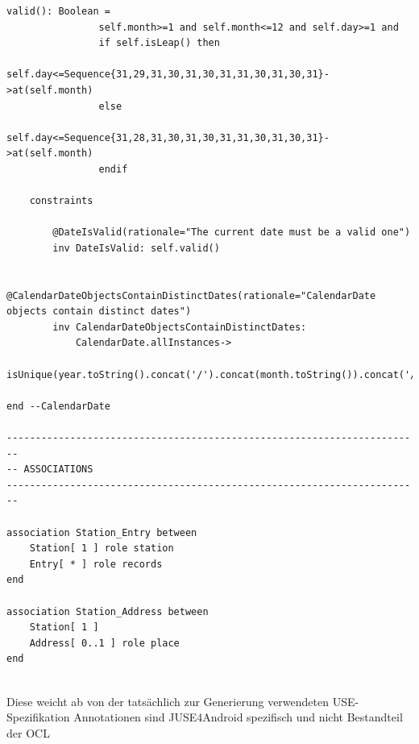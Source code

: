 \documentclass[a4paper,twoside]{article}
\begin{document}
\begin{lstlisting}[caption={Vollständige USE-Spezifikation des IceCream Modells},label=lst:completeUSE]
		valid(): Boolean =
				self.month>=1 and self.month<=12 and self.day>=1 and
				if self.isLeap() then
					self.day<=Sequence{31,29,31,30,31,30,31,31,30,31,30,31}->at(self.month)
				else 
					self.day<=Sequence{31,28,31,30,31,30,31,31,30,31,30,31}->at(self.month)
				endif

	constraints
	
		@DateIsValid(rationale="The current date must be a valid one")
		inv DateIsValid: self.valid()
		
		@CalendarDateObjectsContainDistinctDates(rationale="CalendarDate objects contain distinct dates")
		inv CalendarDateObjectsContainDistinctDates:
			CalendarDate.allInstances->
				isUnique(year.toString().concat('/').concat(month.toString()).concat('/').concat(day.toString()))
		
end --CalendarDate

------------------------------------------------------------------------
-- ASSOCIATIONS
------------------------------------------------------------------------
	
association Station_Entry between
	Station[ 1 ] role station
	Entry[ * ] role records
end

association Station_Address between
	Station[ 1 ] 
	Address[ 0..1 ] role place
end


\end{lstlisting}

Diese weicht ab von der tatsächlich zur Generierung verwendeten USE-Spezifikation 
 Annotationen sind JUSE4Android spezifisch und nicht Bestandteil der OCL


\twocolumn

\vfill
\end{document}
